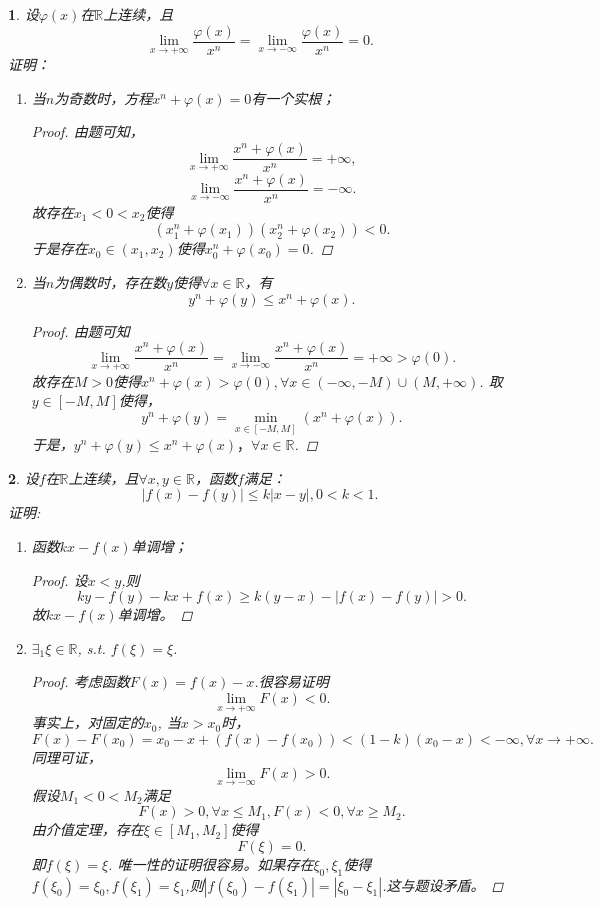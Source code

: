 \documentclass[utf8]{book}
\newtheorem{example}{}[section]             %
\begin{document}
\begin{example}
设$\varphi(x)$在$\mathbb{R}$上连续，且
$$\displaystyle\lim_{x\to +\infty}\frac{\varphi(x)}{x^n} = \displaystyle\lim_{x\to -\infty}\frac{\varphi(x)}{x^n}=0.$$
证明：
\renewcommand\labelenumi{\normalfont(\theenumi)}
\begin{enumerate}
\item 当$n$为奇数时，方程$x^n+\varphi(x)=0$有一个实根；
\begin{proof}
由题可知，$$\displaystyle\lim_{x\to +\infty}\frac{x^n+\varphi(x)}{x^n}=+\infty,$$
$$\displaystyle\lim_{x\to -\infty}\frac{x^n+\varphi(x)}{x^n}=-\infty.$$
故存在$x_1< 0 < x_2$使得$$\left(x_1^n+\varphi(x_1)\right)\left(x_2^n+\varphi(x_2)\right) < 0.$$
于是存在$x_0\in (x_1, x_2)$使得$x_0^n+\varphi(x_0) = 0$.
\end{proof}
\item 当$n$为偶数时，存在数$y$使得$\forall x\in\mathbb{R}$，有
$$y^n+\varphi(y) \leq x^n+\varphi(x).$$
\begin{proof}
由题可知$$\displaystyle\lim_{x\to +\infty}\frac{x^n+\varphi(x)}{x^n} = \displaystyle\lim_{x\to -\infty}\frac{x^n+\varphi(x)}{x^n}=+\infty > \varphi(0).$$
故存在$M>0$使得$x^n+\varphi(x) > \varphi(0),\forall x\in (-\infty,-M)\cup (M, +\infty)$.
取$y\in[-M, M]$使得，$$y^n+\varphi(y) = \displaystyle\min_{x\in[-M, M]}(x^n+\varphi(x)).$$
于是，$y^n+\varphi(y) \leq x^n+\varphi(x)， \forall x\in\mathbb{R}$.
\end{proof}
\end{enumerate}
\end{example}
\begin{example}
设$f$在$\mathbb{R}$上连续，且$\forall x,y\in\mathbb{R}$，函数$f$满足：
$$|f(x)-f(y)|\leq k|x-y|, 0< k < 1.$$
证明:
\renewcommand\labelenumi{\normalfont(\theenumi)}
\begin{enumerate}
\item 函数$kx-f(x)$单调增；
\begin{proof}设$x < y$,则$$ky-f(y)-kx+f(x) \geq k(y-x) - |f(x)-f(y)| > 0.$$
故$kx-f(x)$单调增。
\end{proof}
\item $\exists_1 \xi\in\mathbb{R}$, s.t. $f(\xi)=\xi$.
\begin{proof}考虑函数$F(x)=f(x)-x$.很容易证明
$$\displaystyle\lim_{x\to +\infty}F(x) < 0.$$
事实上，对固定的$x_0$, 当$x > x_0$时，
$$F(x) - F(x_0) = x_0-x +\left(f(x) - f(x_0)\right) < (1-k)(x_0 - x) < -\infty, \forall x\to  +\infty.$$
同理可证，
$$\displaystyle\lim_{x\to -\infty}F(x) > 0.$$
假设$M_1 < 0 <M_2$满足
$$F(x)  > 0, 
\forall x \leq M_1, F(x) < 0,\forall x \geq M_2.$$
由介值定理，存在$\xi\in[M_1, M_2]$使得$$F(\xi) = 0.$$
即$f(\xi)=\xi$.
唯一性的证明很容易。如果存在$\xi_0,\xi_1$使得$f(\xi_0)= \xi_0, f(\xi_1)=
\xi_1$,则$|f(\xi_0)-f(\xi_1)| = |\xi_0-\xi_1|$.这与题设矛盾。
\end{proof}
\end{enumerate}
\end{example}
\end{document}
